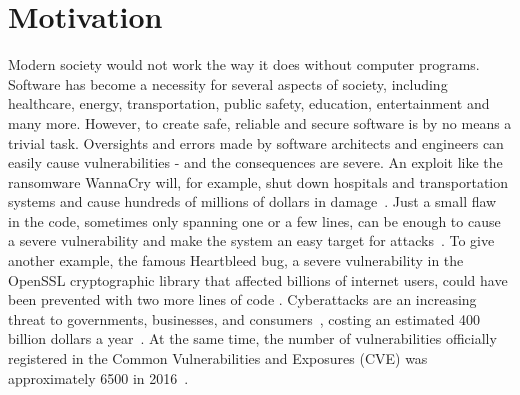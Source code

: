 \documentclass[
	a4paper,
	pagesize,
	pdftex,
	12pt,
	twoside, %
	BCOR=5mm, %
	ngerman,
	fleqn,
	final,
	]{scrartcl}
\begin{document}
\section{Motivation}\label{Motivation}
Modern society would not work the way it does without computer programs. Software has become a necessity for several aspects of society, including healthcare, energy, transportation, public safety, education, entertainment and many more. However, to create safe, reliable and secure software is by no means a trivial task. Oversights and errors made by software architects and engineers can easily cause vulnerabilities - and the consequences are severe. An exploit like the ransomware WannaCry will, for example, shut down hospitals and transportation systems and cause hundreds of millions of dollars in damage~\cite{DanGoodin.2017}. Just a small flaw in the code, sometimes only spanning one or a few lines, can be enough to cause a severe vulnerability and make the system an easy target for attacks~\citep{Yamaguchi.2012}. To give another example, the famous Heartbleed bug, a severe vulnerability in the OpenSSL cryptographic library that affected billions of internet users, could have been prevented with two more lines of code \citep{Durumeric.2014}. Cyberattacks are an increasing threat to governments, businesses, and consumers~\cite{Dam.2017}, costing an estimated 400 billion dollars a year~\cite{Losses.2014}. At the same time, the number of vulnerabilities officially registered in the Common Vulnerabilities and Exposures (CVE) was approximately 6500 in 2016~\cite{CVE}. %
\newline
\end{document}
